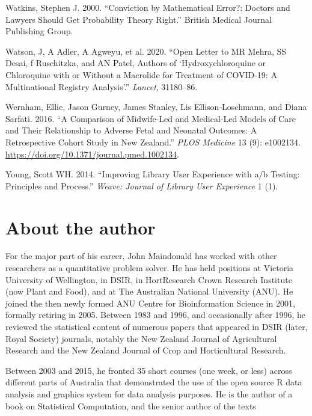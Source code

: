 \documentclass[
  10ptls,
  b5paper]{book}
\newlength{\cslhangindent}
\newenvironment{CSLReferences}[2] %
 {\begin{list}{}{%
  \setlength{\itemindent}{0pt}
  \setlength{\leftmargin}{0pt}
  \setlength{\parsep}{0pt}
  \ifodd #1
   \setlength{\leftmargin}{\cslhangindent}
   \setlength{\itemindent}{-1\cslhangindent}
  \fi
  \setlength{\itemsep}{#2\baselineskip}}}
 {\end{list}}
\begin{document}
\begin{CSLReferences}{1}{0}
Watkins, Stephen J. 2000. {``Conviction by Mathematical Error?: Doctors and Lawyers Should Get Probability Theory Right.''} British Medical Journal Publishing Group.

Watson, J, A Adler, A Agweyu, et al. 2020. {``Open Letter to MR Mehra, SS Desai, f Ruschitzka, and AN Patel, Authors of {`Hydroxychloroquine or Chloroquine with or Without a Macrolide for Treatment of COVID-19: A Multinational Registry Analysis'}.''} \emph{Lancet}, 31180--86.

Wernham, Ellie, Jason Gurney, James Stanley, Lis Ellison-Loschmann, and Diana Sarfati. 2016. {``A Comparison of Midwife-Led and Medical-Led Models of Care and Their Relationship to Adverse Fetal and Neonatal Outcomes: A Retrospective Cohort Study in New Zealand.''} \emph{PLOS Medicine} 13 (9): e1002134. \url{https://doi.org/10.1371/journal.pmed.1002134}.

Young, Scott WH. 2014. {``Improving Library User Experience with a/b Testing: Principles and Process.''} \emph{Weave: Journal of Library User Experience} 1 (1).

\end{CSLReferences}

\newpage

\thispagestyle{empty}

\chapter*{About the author}\label{author}

For the major part of his career, John Maindonald has worked with other
researchers as a quantitative problem solver.
He has held positions at Victoria University of Wellington, in DSIR, in HortResearch Crown Research Institute (now Plant and Food), and at The Australian National University (ANU).
He joined the then newly formed ANU Centre for Bioinformation Science in 2001, formally retiring in 2005.
Between 1983 and 1996, and occasionally after 1996, he reviewed the statistical content of numerous papers that appeared in DSIR (later, Royal Society) journals, notably the New Zealand Journal of Agricultural Research and the New Zealand Journal of Crop and Horticultural Research.

Between 2003 and 2015, he fronted 35 short courses (one week, or less)
across different parts of Australia that demonstrated the use of the open source R data analysis and graphics system for data analysis purposes.
He is the author of a book on Statistical Computation, and the senior author of
the texts
\end{document}
